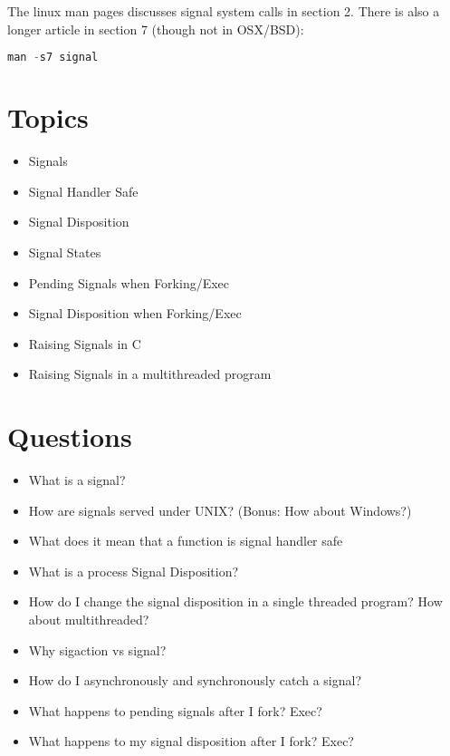 The linux man pages discusses signal system calls in section 2. There is also a longer article in section 7 (though not in OSX/BSD):

\begin{lstlisting}[language=C]
man -s7 signal
\end{lstlisting}

\section{Topics}\label{topics}

\begin{itemize}
\tightlist
\item
  Signals
\item
  Signal Handler Safe
\item
  Signal Disposition
\item
  Signal States
\item
  Pending Signals when Forking/Exec
\item
  Signal Disposition when Forking/Exec
\item
  Raising Signals in C
\item
  Raising Signals in a multithreaded program
\end{itemize}

\section{Questions}\label{questions}

\begin{itemize}
\tightlist
\item
  What is a signal?
\item
  How are signals served under UNIX? (Bonus: How about Windows?)
\item
  What does it mean that a function is signal handler safe
\item
  What is a process Signal Disposition?
\item
  How do I change the signal disposition in a single threaded program?
  How about multithreaded?
\item
  Why sigaction vs signal?
\item
  How do I asynchronously and synchronously catch a signal?
\item
  What happens to pending signals after I fork? Exec?
\item
  What happens to my signal disposition after I fork? Exec?
\end{itemize}



